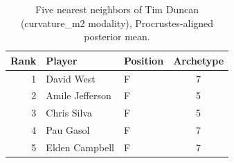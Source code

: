\begin{table}[htbp]
  \centering\small
  \begin{tabular}{rllc}
    \toprule
    Rank & Player & Position & Archetype \\
    \midrule
    1 & David West & F & 7 \\
    2 & Amile Jefferson & F & 5 \\
    3 & Chris Silva & F & 5 \\
    4 & Pau Gasol & F & 7 \\
    5 & Elden Campbell & F & 7 \\
    \bottomrule
  \end{tabular}
  \caption{Five nearest neighbors of Tim Duncan (curvature_m2 modality), Procrustes-aligned posterior mean.}
  \label{tab:Tim_Duncan_neighbors_curvature_m2}
\end{table}

